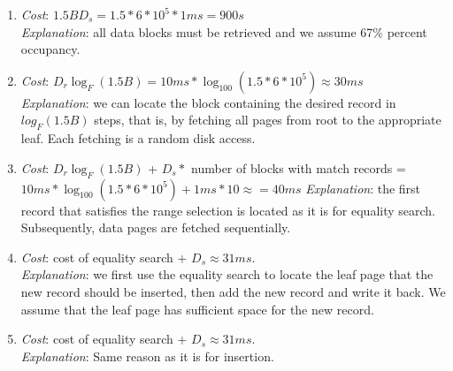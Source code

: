 \documentclass[10pt]{article}
\begin{document}
\begin{enumerate}
\begin{enumerate}
\item \emph{Cost}: $1.5BD_s = 1.5 * 6 * 10^5 * 1ms = 900s$\\
  \emph{Explanation}: all data blocks must be retrieved and we assume
  67\% percent occupancy.
\item \emph{Cost}: $D_r\log_F(1.5B) = 10ms * \log_{100}(1.5*6*10^5)
  \approx 30ms$\\
  \emph{Explanation}: we can locate the block containing the desired
  record in $log_F(1.5B)$ steps, that is, by fetching all pages from
  root to the appropriate leaf. Each fetching is a random disk access.
\item \emph{Cost}: $D_r\log_F(1.5B)$ + $D_s * $ number of blocks with
  match records = $10ms * \log_{100}(1.5*6*10^5) + 1ms * 10 \approx =
  40ms$
  \emph{Explanation}: the first record that satisfies the range
  selection is located as it is for equality search. Subsequently,
  data pages are fetched sequentially.
\item \emph{Cost}: cost of equality search + $D_s \approx 31ms$.\\
  \emph{Explanation}: we first use the equality search to locate the
  leaf page that the new record should be inserted, then add the new
  record and write it back. We assume that the leaf page has
  sufficient space for the new record.
\item \emph{Cost}: cost of equality search + $D_s \approx 31ms$.\\
  \emph{Explanation}: Same reason as it is for insertion.


\end{enumerate}
\end{enumerate}
\end{document}

